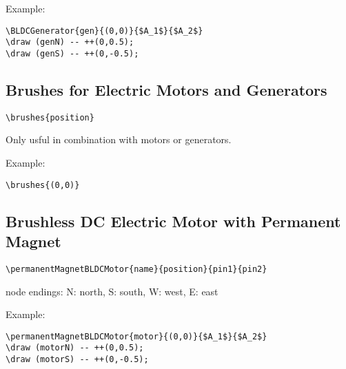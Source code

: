 \documentclass[parskip=full]{scrartcl}
\begin{document}
Example:\\
\begin{minipage}{0.8\textwidth}
\begin{verbatim}
\BLDCGenerator{gen}{(0,0)}{$A_1$}{$A_2$}
\draw (genN) -- ++(0,0.5);
\draw (genS) -- ++(0,-0.5);
\end{verbatim}
\end{minipage}
\begin{minipage}{0.19\textwidth}
\end{minipage}

\subsection{Brushes for Electric Motors and Generators}

\begin{verbatim}
\brushes{position}
\end{verbatim}
Only usful in combination with motors or generators.

Example:\\
\begin{minipage}{0.8\textwidth}
\begin{verbatim}
\brushes{(0,0)}
\end{verbatim}
\end{minipage}
\begin{minipage}{0.19\textwidth}
\end{minipage}

\subsection{Brushless DC Electric Motor with Permanent Magnet}

\begin{verbatim}
\permanentMagnetBLDCMotor{name}{position}{pin1}{pin2}
\end{verbatim}
node endings: N: north, S: south, W: west, E: east

Example:\\
\begin{minipage}{0.8\textwidth}
\begin{verbatim}
\permanentMagnetBLDCMotor{motor}{(0,0)}{$A_1$}{$A_2$}
\draw (motorN) -- ++(0,0.5);
\draw (motorS) -- ++(0,-0.5);
\end{verbatim}
\end{minipage}
\begin{minipage}{0.19\textwidth}
\end{minipage}
\end{document}
